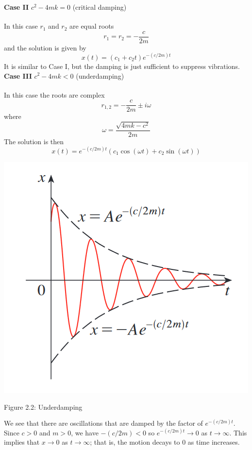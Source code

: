 \documentclass[10pt,reqno]{book}
\theoremstyle{definition}
\begin{document}
	\begin{center}
	\end{center}

	\noindent \textbf{Case II} $ c^2 - 4mk = 0 $ (critical damping)\\ \\
	In this case $ r_1 $ and $ r_2 $ are equal roots
	\[ r_1 = r_2 = -\frac{c}{2m} \]
	and the solution is given by
	\[ x(t) = (c_1 + c_2 t)e^{-(c/2m)t} \]
	It is similar to Case I, but the damping is just sufficient to suppress vibrations. \\
	
	\noindent \textbf{Case III} $ c^2 - 4mk < 0 $ (underdamping) \\ \\
	In this case the roots are complex
	\[ r_{1,2} = -\frac{c}{2m} \pm i \omega \]
	where
	\[ \omega = \frac{\sqrt{4mk - c^2}}{2m} \]
	The solution is then
	\[ x(t) = e^{-(c/2m)t}(c_1\cos(\omega t) + c_2 \sin(\omega t)) \]
	\begin{center}
		\includegraphics[scale=0.65]{de_1.png}
		
		Figure 2.2: Underdamping
	\end{center}
	We see that there are oscillations that are damped by the factor of $ e^{-(c/2m)t} $. Since $ c > 0 $ and $ m > 0 $, we have $ -(c/2m) < 0 $ so $ e^{-(c/2m)t} \to 0 $ as $ t \to \infty $. This implies that $ x \to 0 $ as $ t \to \infty $; that is, the motion decays to 0 as time increases.
	
\end{document}
